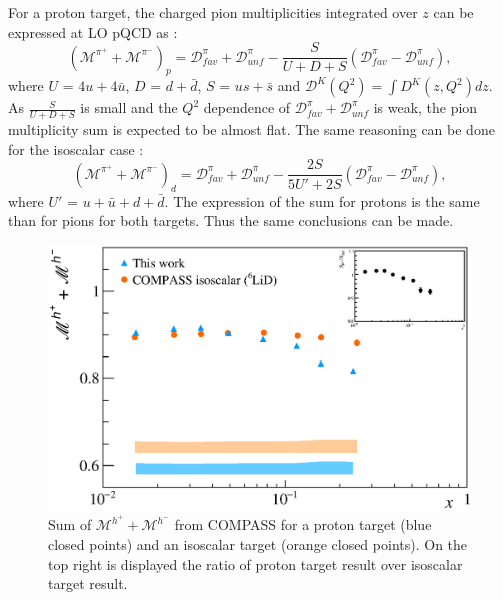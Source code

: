 For a proton target, the charged pion multiplicities integrated over $z$ can be expressed at LO pQCD as \cite{MarcinNic}:
%
\begin{equation}\label{eq:pisum}
  \left( \mathscr{M}^{\pi^+}+\mathscr{M}^{\pi^-} \right)_p = \mathscr{D}^{\pi}_{fav} + \mathscr{D}^{\pi}_{unf} - \frac{S}{U+D+S} \left( \mathscr{D}^{\pi}_{fav} - \mathscr{D}^{\pi}_{unf} \right),
\end{equation}
%
where $U$ = $4u+4\bar{u}$, $D$ = $d+\bar{d}$, $S$ = $us+\bar{s}$ and $\mathscr{D}^K(Q^2) = \int D^K(z,Q^2) dz $. As $\frac{S}{U+D+S}$ is small and the $Q^2$ dependence of $\mathscr{D}^{\pi}_{fav} + \mathscr{D}^{\pi}_{unf}$ is weak, the pion multiplicity sum is expected to be almost flat. The same reasoning can be done for the isoscalar case \cite{MarcinNic}:
%
\begin{equation}
  \left( \mathscr{M}^{\pi^+}+\mathscr{M}^{\pi^-} \right)_d = \mathscr{D}^{\pi}_{fav} + \mathscr{D}^{\pi}_{unf} - \frac{2S}{5U'+2S} \left( \mathscr{D}^{\pi}_{fav} - \mathscr{D}^{\pi}_{unf} \right),
\end{equation}
%
where $U'$ = $u+\bar{u}+d+\bar{d}$. The expression of the sum for protons is the same than for pions for both targets. Thus the same conclusions can be made.

\newpage

\begin{figure}[!h]
  \centering
	\includegraphics[scale=0.5]{./gfx/Mult_h_sum.eps}
	\caption{Sum of $\mathscr{M}^{h^+}+\mathscr{M}^{h^-}$ from COMPASS for a proton target (blue closed points) and an isoscalar target (orange closed points). On the top right is displayed the ratio of proton target result over isoscalar target result.}
	\label{pic:hsum}
\end{figure}

